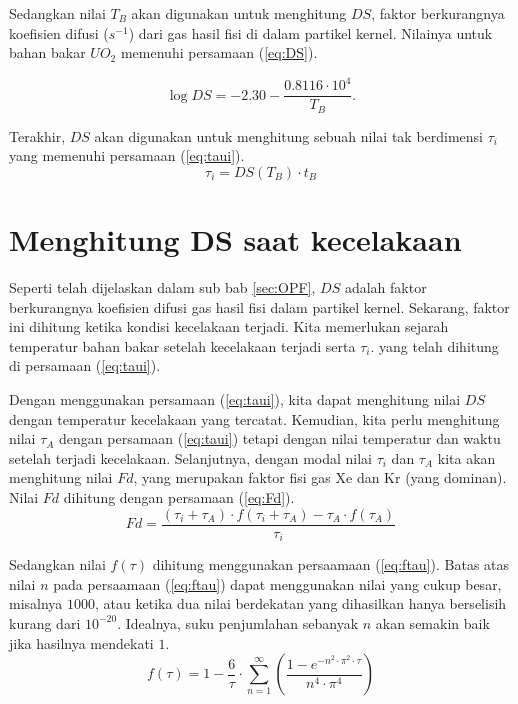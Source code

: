 \documentclass[a4paper,11pt]{report}
\begin{document}
Sedangkan nilai $T_B$ akan digunakan untuk menghitung $DS$, faktor berkurangnya koefisien difusi ($s^{-1}$) dari gas hasil fisi di dalam partikel kernel. Nilainya untuk bahan bakar $UO_2$ memenuhi persamaan (\ref{eq:DS}).

\begin{equation}
  \log DS=-2.30-\frac{0.8116 \cdot 10^4}{T_B}
  \label{eq:DS}.
\end{equation}

Terakhir, $DS$ akan digunakan untuk menghitung sebuah nilai tak berdimensi $\tau_i$ yang memenuhi persamaan (\ref{eq:taui}).
\begin{equation}
  \tau_i=DS(T_B) \cdot t_B
  \label{eq:taui}
\end{equation}

\section{Menghitung DS saat kecelakaan}
Seperti telah dijelaskan dalam sub bab \ref{sec:OPF}, $DS$ adalah faktor berkurangnya koefisien difusi gas hasil fisi dalam partikel kernel. Sekarang, faktor ini dihitung ketika kondisi kecelakaan terjadi. Kita memerlukan sejarah temperatur bahan bakar setelah kecelakaan terjadi serta $\tau_i$. yang telah dihitung di persamaan (\ref{eq:taui}).

Dengan menggunakan persamaan (\ref{eq:taui}), kita dapat menghitung nilai $DS$ dengan temperatur kecelakaan yang tercatat.  Kemudian, kita perlu menghitung nilai $\tau_A$ dengan persamaan (\ref{eq:taui}) tetapi dengan nilai temperatur dan waktu setelah terjadi kecelakaan. Selanjutnya, dengan modal nilai $\tau_i$ dan $\tau_A$ kita akan menghitung nilai $Fd$, yang merupakan faktor fisi gas Xe dan Kr (yang dominan). Nilai $Fd$ dihitung dengan persamaan (\ref{eq:Fd}).
\begin{equation}
  Fd=\frac{(\tau_i + \tau_A) \cdot f(\tau_i + \tau_A) - \tau_A \cdot f(\tau_A)}{\tau_i}
  \label{eq:Fd}
\end{equation}

Sedangkan nilai $f(\tau)$ dihitung menggunakan persaamaan (\ref{eq:ftau}). Batas atas nilai $n$ pada persaamaan (\ref{eq:ftau}) dapat menggunakan nilai yang cukup besar, misalnya $1000$, atau ketika dua nilai berdekatan yang dihasilkan hanya berselisih kurang dari $10^{-20}$. Idealnya, suku penjumlahan sebanyak $n$ akan semakin baik jika hasilnya mendekati $1$.
\begin{equation}
  f(\tau)=1-\frac{6}{\tau} \cdot \sum_{n=1}^{\infty} \left( \frac{1-e^{-n^2 \cdot \pi^2 \cdot \tau}}{n^4 \cdot \pi^4} \right)
  \label{eq:ftau}
\end{equation}
\end{document}
